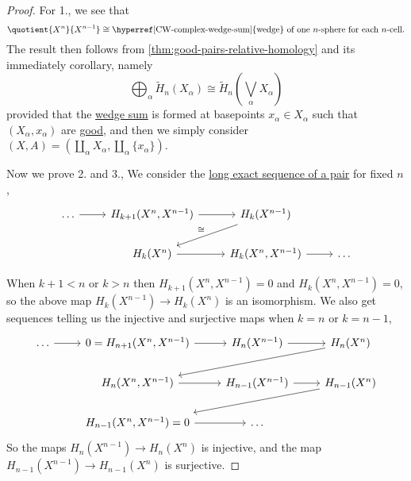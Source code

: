 \begin{proof}
	For 1., we see that
	\[
		\quotient{X^n}{X^{n-1}} \cong \text{\hyperref[CW-complex-wedge-sum]{wedge} of one \(n\)-sphere for each \(n\)-cell}.
	\]
	The result then follows from \autoref{thm:good-pairs-relative-homology} and its immediately corollary, namely
	\[
		\bigoplus_\alpha \widetilde{H} _n(X_\alpha )\cong \widetilde{H} _n\left(\bigvee_\alpha X_\alpha \right)
	\]
	provided that the \hyperref[CW-complex-wedge-sum]{wedge sum} is formed at basepoints \(x_\alpha \in X_\alpha \) such that \((X_\alpha , x_\alpha )\)
	are \hyperref[def:good-pair]{good}, and then we simply consider \((X, A) = (\coprod_{\alpha } X_\alpha , \coprod_{\alpha } \{x_\alpha\})\).

	Now we prove 2. and 3., We consider the \hyperref[thm:long-exact-sequence-of-a-pair]{long exact sequence of a pair} for fixed \(n\),
	\[
		\begin{tikzcd}
			\ldots & {H_{k+1}(X^n, X^{n-1})} & {H_k(X^{n-1})} \\
			& {H_k(X^n)} & {H_k(X^n, X^{n-1})} & \ldots
			\arrow[from=1-1, to=1-2]
			\arrow[from=1-2, to=1-3]
			\arrow["\cong"', from=1-3, to=2-2]
			\arrow[from=2-2, to=2-3]
			\arrow[from=2-3, to=2-4]
		\end{tikzcd}
	\]

	When \(k + 1 < n\) or \(k > n\) then \(H_{k + 1}(X^n, X^{n - 1}) = 0\) and \(H_k(X^n, X^{n - 1}) = 0\), so the above map \(H_k(X^{n - 1}) \to H_k(X^n)\)
	is an isomorphism. We also get sequences telling us the injective and surjective maps when \(k = n\) or \(k = n - 1\),
	\[
		\begin{tikzcd}
			\ldots & {0=H_{n+1}(X^n, X^{n-1})} & {H_n(X^{n-1})} & {H_n(X^n)} \\
			& {H_{n}(X^n, X^{n-1})} & {H_{n-1}(X^{n-1})} & {H_{n-1}(X^n)} \\
			& {H_{n-1}(X^n, X^{n-1})=0} & \ldots
			\arrow[from=1-1, to=1-2]
			\arrow[from=1-2, to=1-3]
			\arrow[from=1-3, to=1-4]
			\arrow[from=1-4, to=2-2]
			\arrow[from=2-2, to=2-3]
			\arrow[from=2-3, to=2-4]
			\arrow[from=2-4, to=3-2]
			\arrow[from=3-2, to=3-3]
		\end{tikzcd}
	\]
	So the maps \(H_n(X^{n - 1}) \to H_n(X^n)\) is injective, and the map \(H_{n - 1}(X^{n - 1}) \to H_{n - 1}(X^n)\) is surjective.


\end{proof}
